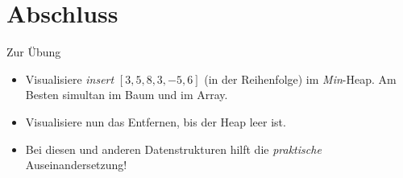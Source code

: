\section{Abschluss}
\begin{frame}{Zur Übung}
    \begin{itemize}[<+(1)->]
        \itemsep7pt
        \item Visualisiere \textit{insert} \([3, 5, 8, 3, -5, 6]\) (in der Reihenfolge) im \textit{Min}-Heap. Am Besten simultan im Baum und im Array.
        \item Visualisiere nun das Entfernen, bis der Heap leer ist.\bigskip
        \item[\scalebox{.5}{\raisebox{3.66pt}{\paletteA{$\blacksquare$}}}] Bei diesen und anderen Datenstrukturen hilft die \textit{praktische} Auseinandersetzung!
    \end{itemize}
\end{frame}
\SidebarReset

